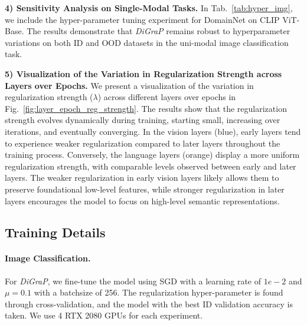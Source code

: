 

\noindent \textbf{4) Sensitivity Analysis on Single-Modal Tasks.} In Tab.~\ref{tab:hyper_img}, we include the hyper-parameter tuning experiment for DomainNet on CLIP ViT-Base. The results demonstrate that \textit{DiGraP} remains robust to hyperparameter variations on both ID and OOD datasets in the uni-modal image classification task.



\noindent \textbf{5) Visualization of the Variation in Regularization Strength across Layers over Epochs.} We present a visualization of the variation in regularization strength ($\lambda$) across different layers over epochs in Fig.~\ref{fig:layer_epoch_reg_strength}. The results show that the regularization strength evolves dynamically during training, starting small, increasing over iterations, and eventually converging. In the vision layers (blue), early layers tend to experience weaker regularization compared to later layers throughout the training process. Conversely, the language layers (orange) display a more uniform regularization strength, with comparable levels observed between early and later layers. The weaker regularization in early vision layers likely allows them to preserve foundational low-level features, while stronger regularization in later layers encourages the model to focus on high-level semantic representations.



\subsection{Training Details}
\label{sec:training}

\paragraph{Image Classification.} For \emph{DiGraP}, we fine-tune the model using SGD with a learning rate of $1e-2$ and $\mu=0.1$ with a batchsize of 256. The regularization hyper-parameter is found through cross-validation, and the model with the best ID validation accuracy is taken. We use 4 RTX 2080 GPUs for each experiment. 

